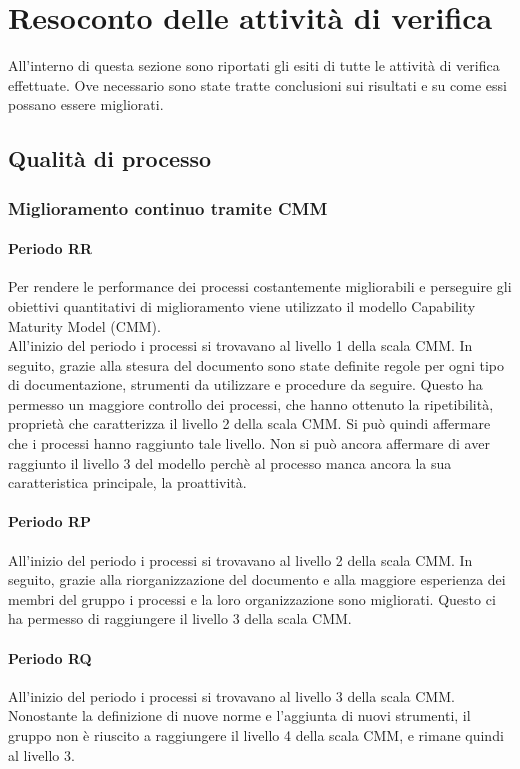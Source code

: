 \documentclass[PdQ.tex]{subfiles}
\begin{document}
\section{Resoconto delle attività di verifica}
All'interno di questa sezione sono riportati gli esiti di tutte le attività di verifica effettuate. Ove necessario sono state tratte conclusioni sui risultati e su come essi possano essere migliorati.

\subsection{Qualità di processo}
	\subsubsection{Miglioramento continuo tramite CMM}
		\paragraph{Periodo RR}
		Per rendere le performance dei processi costantemente migliorabili e perseguire gli obiettivi quantitativi di miglioramento viene utilizzato il modello Capability Maturity Model (CMM).\\
		All'inizio del periodo i processi si trovavano al livello 1 della scala CMM. In seguito, grazie alla stesura del documento \NPdocRR{} sono state definite regole per ogni tipo di documentazione, strumenti da utilizzare e procedure da seguire. Questo ha permesso un maggiore controllo dei processi, che hanno ottenuto la ripetibilità, proprietà che caratterizza il livello 2 della scala CMM. Si può quindi affermare che i processi hanno raggiunto tale livello. Non si può ancora affermare di aver raggiunto il livello 3 del modello perchè al processo manca ancora la sua caratteristica principale, la proattività.\\

\paragraph{Periodo RP}
	
		All'inizio del periodo i processi si trovavano al livello 2 della scala CMM. In seguito, grazie alla riorganizzazione del documento \NPdocRP{} e alla maggiore esperienza dei membri del gruppo i processi e la loro organizzazione sono migliorati. Questo ci ha permesso di raggiungere il livello 3 della scala CMM. 	
	
\paragraph{Periodo RQ}
	All'inizio del periodo i processi si trovavano al livello 3 della scala CMM. Nonostante la definizione di nuove norme e l'aggiunta di nuovi strumenti, il gruppo non è riuscito a raggiungere il livello 4 della scala CMM, e rimane quindi al livello 3.
		
\end{document}
